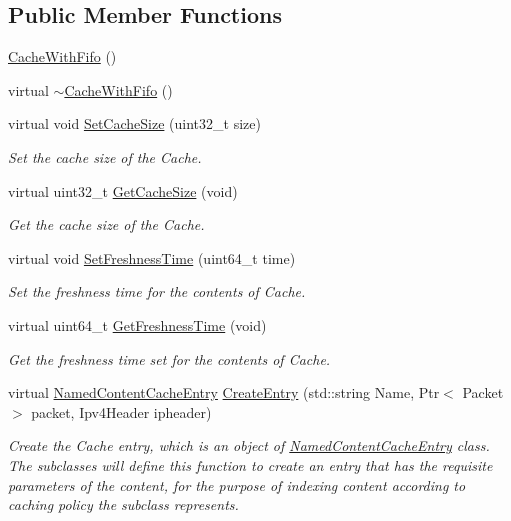 \subsection*{Public Member Functions}
\begin{DoxyCompactItemize}
\item 
\hyperlink{classns3_1_1CacheWithFifo_a1171d394f7f60439263b8b2dedfa8ff5}{Cache\-With\-Fifo} ()
\item 
virtual \hyperlink{classns3_1_1CacheWithFifo_aa2665a704001cdde625684a23eb95177}{$\sim$\-Cache\-With\-Fifo} ()
\item 
virtual void \hyperlink{classns3_1_1CacheWithFifo_a6e92a91f36ac87a001644e299be4dd41}{Set\-Cache\-Size} (uint32\-\_\-t size)
\begin{DoxyCompactList}\small\item\em Set the cache size of the Cache. \end{DoxyCompactList}\item 
virtual uint32\-\_\-t \hyperlink{classns3_1_1CacheWithFifo_ae94f385620f20825ad07995dccc8075a}{Get\-Cache\-Size} (void)
\begin{DoxyCompactList}\small\item\em Get the cache size of the Cache. \end{DoxyCompactList}\item 
virtual void \hyperlink{classns3_1_1CacheWithFifo_a7ad5dd349c8ea2633d6c60c0fb5e43ea}{Set\-Freshness\-Time} (uint64\-\_\-t time)
\begin{DoxyCompactList}\small\item\em Set the freshness time for the contents of Cache. \end{DoxyCompactList}\item 
virtual uint64\-\_\-t \hyperlink{classns3_1_1CacheWithFifo_aa56864aee34859897793284eb7c7f9db}{Get\-Freshness\-Time} (void)
\begin{DoxyCompactList}\small\item\em Get the freshness time set for the contents of Cache. \end{DoxyCompactList}\item 
virtual \hyperlink{classns3_1_1NamedContentCacheEntry}{Named\-Content\-Cache\-Entry} \hyperlink{classns3_1_1CacheWithFifo_ae9be9920ddca0d7a001a054381c0543c}{Create\-Entry} (std\-::string Name, Ptr$<$ Packet $>$ packet, Ipv4\-Header ipheader)
\begin{DoxyCompactList}\small\item\em Create the Cache entry, which is an object of \hyperlink{classns3_1_1NamedContentCacheEntry}{Named\-Content\-Cache\-Entry} class. The subclasses will define this function to create an entry that has the requisite parameters of the content, for the purpose of indexing content according to caching policy the subclass represents. \end{DoxyCompactList}\item 

\end{DoxyCompactItemize}
